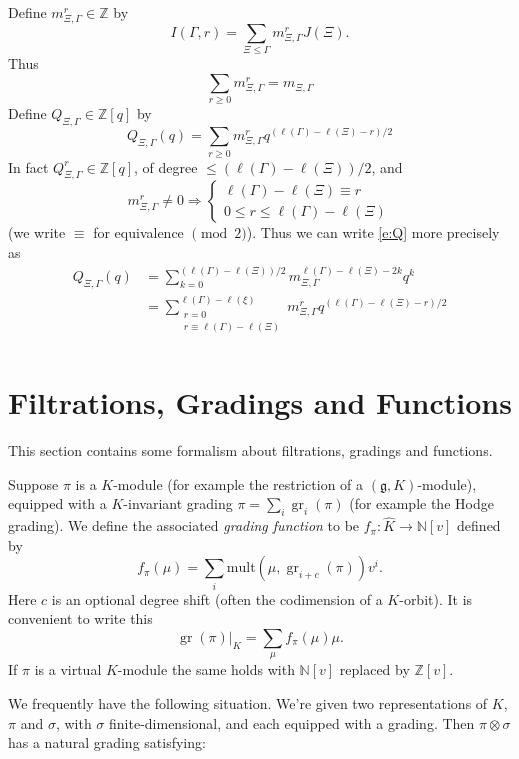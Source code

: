 \documentclass[12pt,leqno]{article}
\DeclareMathOperator{\gr}{\text{gr}}
\newcommand{\mult}{\text{mult}}
\newcommand{\Z}{\mathbb Z}
\newcommand{\N}{\mathbb N}
\renewcommand{\sec}[1]{\section{#1}
\renewcommand{\theequation}{\thesection.\arabic{equation}}
  \setcounter{equation}{0}}
\newcommand{\g}{\mathfrak g}
\newcommand{\Khat}{\widehat K}
\renewcommand{\sec}[1]{\section{#1}
\renewcommand{\theequation}{\thesection.\arabic{equation}}
  \setcounter{equation}{0}}
\begin{document}
Define $m^r_{\Xi,\Gamma}\in\Z$ by
$$
I(\Gamma,r)=\sum_{\Xi\le\Gamma} m^r_{\Xi,\Gamma}J(\Xi).
$$
Thus
$$
\sum_{r\ge 0} m^r_{\Xi,\Gamma}=m_{\Xi,\Gamma}
$$
Define $Q_{\Xi,\Gamma}\in\Z[q]$ by
\begin{equation}
\label{e:Q}
Q_{\Xi,\Gamma}(q)=\sum_{r\ge 0} m^r_{\Xi,\Gamma}q^{(\ell(\Gamma)-\ell(\Xi)-r)/2}
\end{equation}
In fact
$Q_{\Xi,\Gamma}^r\in\Z[q]$, of degree
$\le (\ell(\Gamma)-\ell(\Xi))/2$, and
\begin{equation}
m^{r}_{\Xi,\Gamma}\ne 0\Rightarrow
\begin{cases}
 \ell(\Gamma)-\ell(\Xi)\equiv r  \\
0\le r\le \ell(\Gamma)-\ell(\Xi)
\end{cases}
\end{equation}
(we write $\equiv$ for equivalence $\pmod 2$).
Thus we can write \eqref{e:Q} more precisely as
\begin{equation}
\label{e:Q2}
\begin{aligned}
Q_{\Xi,\Gamma}(q)&=\sum_{k=0}^{(\ell(\Gamma)-\ell(\Xi))/2}m^{\ell(\Gamma)-\ell(\Xi)-2k}_{\Xi,\Gamma}q^k\\
&=\sum_{\substack{r=0\\r\equiv\ell(\Gamma)-\ell(\Xi)}}^{\ell(\Gamma)-\ell(\xi)}m_{\Xi,\Gamma}^rq^{(\ell(\Gamma)-\ell(\Xi)-r)/2}\\
\end{aligned}
\end{equation}

\sec{Filtrations, Gradings and Functions}

This section contains some formalism about filtrations, gradings and functions.

Suppose $\pi$ is a $K$-module (for example the restriction of a $(\g,K)$-module),
equipped with a $K$-invariant  grading $\pi=\sum_i \gr_i(\pi)$ (for example the Hodge grading).
We define the associated
{\it grading function} to be $f_\pi:\Khat\rightarrow\N[v]$ defined by
$$
f_\pi(\mu)=\sum_i \mult(\mu,\gr_{i+c}(\pi))v^i.
$$
Here $c$ is an optional degree shift (often the codimension of a $K$-orbit).
It is convenient to write this
$$
\gr(\pi)|_K=\sum_\mu f_\pi(\mu)\mu.
$$
If $\pi$ is a virtual $K$-module the same holds with $\N[v]$ replaced by $\Z[v]$.


We frequently have the following situation. We're given
two representations of $K$, $\pi$ and $\sigma$, with $\sigma$ finite-dimensional, and
each equipped with a grading. Then $\pi\otimes\sigma$ has a natural grading satisfying:
\end{document}
